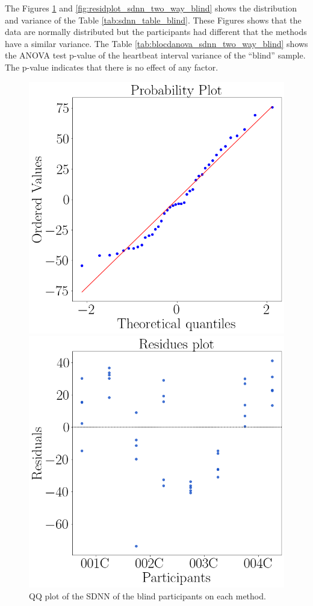The Figures \ref{fig:qqplot_sdnn_two_way_blind} and \ref{fig:residplot_sdnn_two_way_blind} shows the distribution and variance of the Table \ref{tab:sdnn_table_blind}. These Figures shows that the data are normally distributed but the participants had different  that the methods have a similar variance.
The Table \ref{tab:blocdanova_sdnn_two_way_blind} shows the ANOVA test p-value of the heartbeat interval variance of the “blind” sample. The p-value indicates that there is no effect of any factor.



\begin{figure}[!htb]
    \centering
    \begin{minipage}{0.45\textwidth}
        \centering
        \includegraphics[width = 0.8\linewidth]{Resultados/ECG/Figuras/png/qqplot_sdnn_two_way_blind.png}
        \caption{QQ plot of the SDNN of the blind participants on each method.}
        \label{fig:qqplot_sdnn_two_way_blind}
    \end{minipage}
    \begin{minipage}{0.45\textwidth}
        \centering
        \includegraphics[width = 0.8\linewidth]{Resultados/ECG/Figuras/png/residplot_sdnn_two_way_blind.png}

\end{minipage}
\end{figure}
